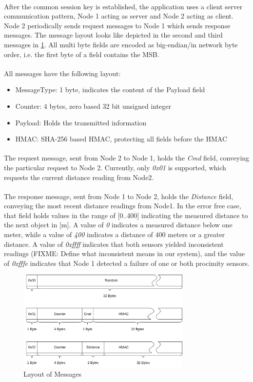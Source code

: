 \paragraph{} After the common session key is established, the application uses a client server communication pattern, Node 1 acting as server and Node 2 acting as client. Node 2 periodically sends request messages to Node 1 which sends response messages. The message layout looks like depicted in the second and third messages in \ref{fig:msg}. All multi byte fields are encoded as big-endian/in network byte order, i.e. the first byte of a field contains the MSB.

\paragraph{} All messages have the following layout:
\begin{itemize}
	\item MessageType: 1 byte, indicates the content of the Payload field
	\item Counter: 4 bytes, zero based 32 bit unsigned integer
	\item Payload: Holds the transmitted information
	\item HMAC: SHA-256 based HMAC, protecting all fields before the HMAC
\end{itemize}

\paragraph{} The request message, sent from Node 2 to Node 1, holds the \emph{Cmd} field, conveying the particular request to Node 2. Currently, only \emph{0x01} is supported, which requests the current distance reading from Node2.

\paragraph{} The response message, sent from Node 1 to Node 2, holds the \emph{Distance} field, conveying the most recent distance readings from Node1. In the error free case, that field holds values in the range of [0..400] indicating the measured distance to the next object in [m]. A value of \emph{0} indicates a measured distance below one meter, while a value of \emph{400} indicates a distance of 400 meters or a greater distance. A value of \emph{0xffff} indicates that both sensors yielded inconsistent readings (FIXME: Define what inconsistent means in our system), and the value of \emph{0xfffe} indicates that Node 1 detected a failure of one or both procimity sensors.


\begin{figure}[h]
	\includegraphics[height=50mm]{images/MessageLayout.png}
	\centering
	\caption{Layout of Messages}
	\label{fig:msg}
\end{figure}
